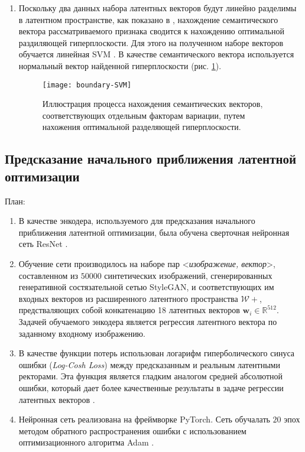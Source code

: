\begin{enumerate}
\item 
Поскольку два данных набора латентных векторов будут линейно разделимы в латентном пространстве, как показано в \cite{StyleGAN}, нахождение семантического вектора рассматриваемого признака сводится к нахождению оптимальной раздиляющей гиперплоскости. 
Для этого на полученном наборе векторов обучается линейная SVM \cite{svm}.
В качестве семантического вектора используется нормальный вектор найденной гиперплоскости (рис. \ref{fig:svm-boundary}).

\begin{figure}[h]
\begin{center}
    \texttt{[image: boundary-SVM]}
    \caption{Иллюстрация процесса нахождения семантических векторов, соответствующих отдельным факторам вариации, путем нахожения оптимальной разделяющей гиперплоскости.}
    \label{fig:svm-boundary}
\end{center}
\end{figure}

\end{enumerate}

\subsection{Предсказание начального приближения латентной оптимизации}
План:
\begin{enumerate}

\item 
В качестве энкодера, используемого для предсказания начального приближения латентной оптимизации, была обучена сверточная нейронная сеть ResNet \cite{he2016resnet}.

\item 
Обучение сети производилось на наборе пар <\emph{изображение, вектор}>, составленном из $50000$ синтетических изображений, сгенерированных генеративной состязательной сетью StyleGAN, и соответствующих им входных векторов из расширенного латентного пространства $\mathcal W+$, предстваляющих собой конкатенацию 18 латентных векторов $\mathbf w_i \in \mathbb R^{512}$.
Задачей обучаемого энкодера является регрессия латентного вектора по заданному входному изображению.

\item 
В качестве функции потерь использован логарифм гиперболического синуса ошибки (\emph{Log-Cosh Loss}) между предсказанным и реальным латентными ректорами. Эта функция является гладким аналогом средней абсолютной ошибки, который дает более качественные результаты в задаче регрессии латентных векторов \cite{chen2019log}.

\item 
Нейронная сеть реализована на фреймворке PyTorch. Сеть обучалать $20$ эпох методом обратного распространения ошибки с использованием оптимизационного алгоритма Adam \cite{kingma2014adam}.


\end{enumerate}

